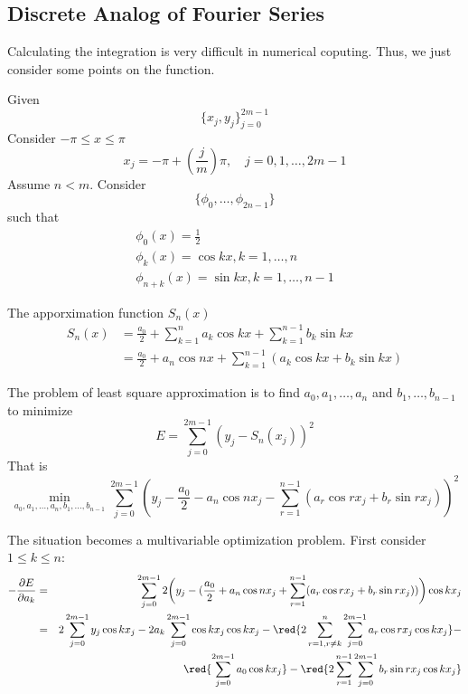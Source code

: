 
\subsection{Discrete Analog of Fourier Series}

Calculating the integration is very difficult in numerical coputing. Thus, we just consider some points on the function.

Given \[
    \{x_j, y_j\}_{j=0}^{2m-1}
\]
Consider $-\pi \le x \le \pi$ \[
    x_j = -\pi + \left(\frac{j}{m}\right)\pi, \quad j = 0, 1, \dots, 2m-1
\]
Assume $n < m$. Consider \[
    \{\phi_0, \dots, \phi_{2n-1}\}
\]
such that \begin{gather*}
\phi_0(x) = 
\frac{1}{2}\\
\phi_k(x) =
\cos kx, k = 1, \ldots, n\\  
\phi_{n+k}(x) =
\sin kx, k = 1, \ldots, n-1
\end{gather*}

\begin{definition}
    The apporximation function $S_n(x)$ \begin{align*}
        S_n(x) &= \frac{a_0}{2} + \sum_{k=1}^{n} a_k \cos kx + \sum_{k=1}^{n-1} b_k \sin kx \\
        &= \frac{a_0}{2} + a_n \cos nx + \sum_{k=1}^{n-1} (a_k \cos kx + b_k \sin kx) 
    \end{align*}
\end{definition}

The problem of least square approximation is to find $a_0, a_1, \dots, a_n$ and $b_1, \dots, b_{n-1}$ to minimize \[
    E = \sum_{j=0}^{2m-1} (y_j - S_n(x_j))^2
\]
That is \[
    \min_{a_0, a_1, \dots, a_n, b_1, \dots, b_{n-1}} \sum_{j=0}^{2m-1} \left(y_j - \frac{a_0}{2} - a_n \cos nx_j - \sum_{r=1}^{n-1} (a_r \cos rx_j + b_r \sin rx_j)\right)^2
\]

The situation becomes a multivariable optimization problem. First consider $1 \le k \le n$:
\begin{eqnarray*}
-\frac{\partial E}{\partial a_k} 
& = & \sum_{j=0}^{2m-1}
2 \biggl(y_j - (\frac{a_0}{2}
+ a_n \cos nx_j + 
\sum_{r=1}^{n-1} (a_r \cos rx_j 
+ b_r \sin r x_j)
)\biggr)\cos k x_j \\
& = & 
 2  \sum_{j=0}^{2m-1}
y_j \cos k x_j 
- 
2 a_k \sum_{j=0}^{2m-1}
\cos kx_j \cos k x_j - \red{2 \sum_{r=1, r \neq k}^{n} \sum_{j=0}^{2m-1}
a_r \cos rx_j 
\cos k x_j } - \\
&& \red{\sum_{j=0}^{2m-1}
a_0 \cos k x_j } - \red{2 \sum_{r=1}^{n-1} \sum_{j=0}^{2m-1}
b_r \sin r x_j \cos k x_j }
\end{eqnarray*}


